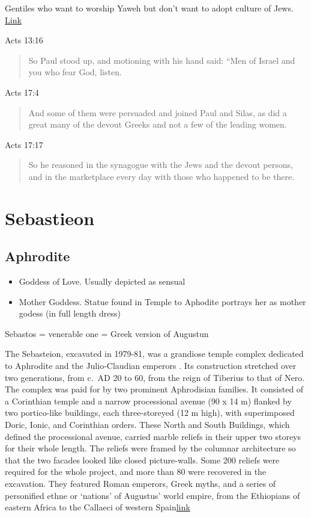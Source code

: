 \documentclass[
]{book}
\begin{document}
Gentiles who want to worship Yaweh but don't want to adopt culture of Jews. \href{https://www.biblestudymagazine.com/bible-study-magazine-blog/2016/6/3/who-were-the-god-fearers}{Link}

Acts 13:16

\begin{quote}
So Paul stood up, and motioning with his hand said:
``Men of Israel and you who fear God, listen.
\end{quote}

Acts 17:4

\begin{quote}
And some of them were persuaded and joined Paul and Silas, as did a great many of the devout Greeks and not a few of the leading women.
\end{quote}

Acts 17:17

\begin{quote}
So he reasoned in the synagogue with the Jews and the devout persons, and in the marketplace every day with those who happened to be there.
\end{quote}

\hypertarget{sebastieon}{%
\section{Sebastieon}\label{sebastieon}}

\hypertarget{aphrodite}{%
\subsection{Aphrodite}\label{aphrodite}}

\begin{itemize}
\item
  Goddess of Love. Usually depicted as sensual
\item
  Mother Goddess. Statue found in Temple to Aphodite portrays her as mother godess (in full length dress)
\end{itemize}

Sebastos = venerable one = Greek version of Augustun

The Sebasteion, excavated in 1979-81, was a grandiose temple complex dedicated to Aphrodite and the Julio-Claudian emperors . Its construction stretched over two generations, from c.~AD 20 to 60, from the reign of Tiberius to that of Nero. The complex was paid for by two prominent Aphrodisian families. It consisted of a Corinthian temple and a narrow processional avenue (90 x 14 m) flanked by two portico-like buildings, each three-storeyed (12 m high), with superimposed Doric, Ionic, and Corinthian orders. These North and South Buildings, which defined the processional avenue, carried marble reliefs in their upper two storeys for their whole length. The reliefs were framed by the columnar architecture so that the two facades looked like closed picture-walls. Some 200 reliefs were required for the whole project, and more than 80 were recovered in the excavation. They featured Roman emperors, Greek myths, and a series of personified ethne or `nations' of Augustus' world empire, from the Ethiopians of eastern Africa to the Callaeci of western Spain\href{http://aphrodisias.classics.ox.ac.uk/sebasteion.html}{link}
\end{document}
